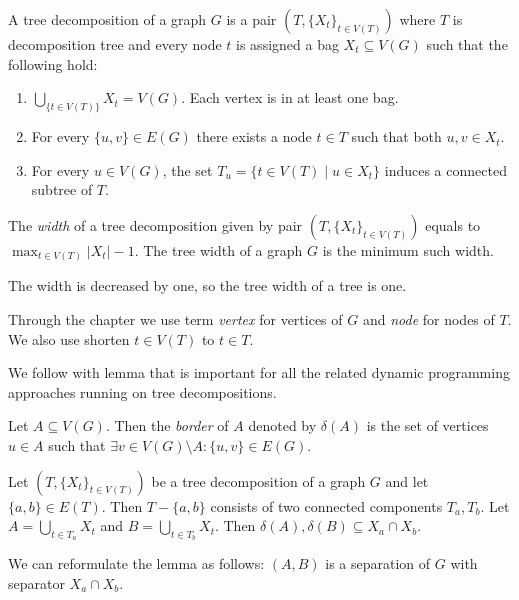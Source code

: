 %
\begin{definition}
	A tree decomposition of a graph \( G \) is
	a pair \( (T, {\{X_t\}}_{t \in V ( T )}) \)
	where \( T \) is decomposition tree and every node \( t \)
	is assigned a bag \( X_t \subseteq V(G) \) such that the following hold:
	\begin{enumerate}
		\item \( \bigcup_{\{t \in V(T)\}} X_t = V(G) \).
		      Each vertex is in at least one bag.
		\item For every \( \{u,v\} \in E(G) \) there exists
		      a node \( t \in T \) such that both \( u, v \in X_t \).
		\item For every \( u \in V(G) \),
		      the set \( T_u = \{t \in V(T) \mid u \in X_t\} \)
		      induces a connected subtree of \( T \).
	\end{enumerate}
\end{definition}
%
\begin{definition}
	The \emph{width} of a tree decomposition given by pair
	\( (T, {\{X_t\}}_{t \in V ( T )}) \)
	equals to \( \max_{t\in V(T)} |X_t| - 1 \).
	The tree width of a graph \( G \) is the minimum such width.
\end{definition}
%
The width is decreased by one, so the tree width of a tree is one.

Through the chapter we use term \emph{vertex} for vertices of \( G \)
and \emph{node} for nodes of \( T \).
We also use shorten \( t \in V(T) \) to \( t \in T \).

We follow with lemma that is important for all the related
dynamic programming approaches running on tree decompositions.
%
\begin{definition}
	Let \( A \subseteq V(G) \). Then the \emph{border} of \( A \) denoted by \( \delta(A) \)
	is the set of vertices \( u \in A \)
	such that \( \exists v \in V(G) \setminus A : \{u, v\} \in E(G) \).
\end{definition}
%
\begin{lemma}
	Let \( (T, {\{X_t\}}_{t \in V ( T )}) \)
	be a tree decomposition of a graph \( G \)
	and let \( \{a, b\} \in E(T) \).
	Then \( T - \{a, b\} \) consists of two connected components \( T_a, T_b \).
	Let \( A = \bigcup_{t \in T_a} X_t \) and \( B = \bigcup_{t \in T_b} X_t \).
	Then \( \delta(A), \delta(B) \subseteq X_a \cap X_b \).
\end{lemma}
%
We can reformulate the lemma as follows:
\( (A, B) \) is a separation of \( G \) with separator \( X_a \cap X_b \).

